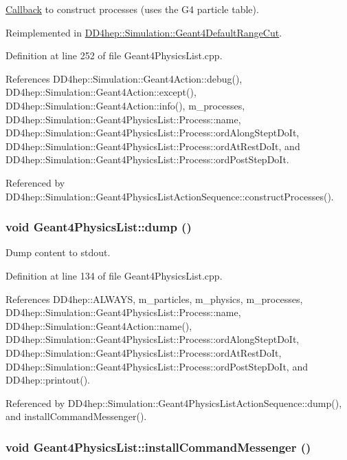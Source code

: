 \hyperlink{class_d_d4hep_1_1_callback}{Callback} to construct processes (uses the G4 particle table). 

Reimplemented in \hyperlink{class_d_d4hep_1_1_simulation_1_1_geant4_default_range_cut_a5625f1bf8f0c47bb6b29c73ce3e590eb}{DD4hep::Simulation::Geant4DefaultRangeCut}.

Definition at line 252 of file Geant4PhysicsList.cpp.

References DD4hep::Simulation::Geant4Action::debug(), DD4hep::Simulation::Geant4Action::except(), DD4hep::Simulation::Geant4Action::info(), m\_\-processes, DD4hep::Simulation::Geant4PhysicsList::Process::name, DD4hep::Simulation::Geant4PhysicsList::Process::ordAlongSteptDoIt, DD4hep::Simulation::Geant4PhysicsList::Process::ordAtRestDoIt, and DD4hep::Simulation::Geant4PhysicsList::Process::ordPostStepDoIt.

Referenced by DD4hep::Simulation::Geant4PhysicsListActionSequence::constructProcesses().\hypertarget{class_d_d4hep_1_1_simulation_1_1_geant4_physics_list_a938fd59bb0072ba9c304828aeb6e267b}{
\subsubsection[{dump}]{\setlength{\rightskip}{0pt plus 5cm}void Geant4PhysicsList::dump ()}}
\label{class_d_d4hep_1_1_simulation_1_1_geant4_physics_list_a938fd59bb0072ba9c304828aeb6e267b}


Dump content to stdout. 

Definition at line 134 of file Geant4PhysicsList.cpp.

References DD4hep::ALWAYS, m\_\-particles, m\_\-physics, m\_\-processes, DD4hep::Simulation::Geant4PhysicsList::Process::name, DD4hep::Simulation::Geant4Action::name(), DD4hep::Simulation::Geant4PhysicsList::Process::ordAlongSteptDoIt, DD4hep::Simulation::Geant4PhysicsList::Process::ordAtRestDoIt, DD4hep::Simulation::Geant4PhysicsList::Process::ordPostStepDoIt, and DD4hep::printout().

Referenced by DD4hep::Simulation::Geant4PhysicsListActionSequence::dump(), and installCommandMessenger().\hypertarget{class_d_d4hep_1_1_simulation_1_1_geant4_physics_list_af18b7d6454f56d0aa6e55a2046cff019}{
\subsubsection[{installCommandMessenger}]{\setlength{\rightskip}{0pt plus 5cm}void Geant4PhysicsList::installCommandMessenger ()}}
\label{class_d_d4hep_1_1_simulation_1_1_geant4_physics_list_af18b7d6454f56d0aa6e55a2046cff019}


